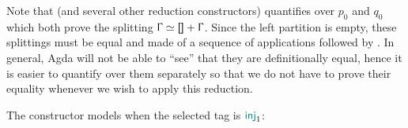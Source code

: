 Note that  (and several other reduction
constructors) quantifies over $p_0$ and $q_0$ which both prove the splitting
$\Context \simeq \AgdaInductiveConstructor{[]} + \Context$. Since the left
partition is empty, these splittings must be equal and made of a sequence of
\AgdaInductiveConstructor{>} applications followed by
. In general, Agda will not be able to ``see'' that
they are definitionally equal, hence it is easier to quantify over them separately so
that we do not have to prove their equality whenever we wish to apply this
reduction.

The constructor  models \RSelect when the
selected tag is $\mathsf{\color{teal}inj}_1$:

\begin{code}%
%
\>[2]%
\>[14]\AgdaSymbol{:}%
\>[285I]\AgdaSpace{}%
\AgdaSpace{}%
\AgdaSpace{}%
\AgdaSpace{}%
\AgdaSpace{}%
\AgdaSpace{}%
\AgdaSymbol{\}}\<%
\\
\>[.][@{}l@{}]\<[285I]%
\>[16]\AgdaSymbol{(}\AgdaSpace{}%
\AgdaSymbol{:}\AgdaSpace{}%
\AgdaSpace{}%
\AgdaSpace{}%
\AgdaSpace{}%
\AgdaOperator{\AgdaDatatype{+}}\AgdaSpace{}%
\AgdaSymbol{)}\AgdaSpace{}%
\AgdaSymbol{(}\AgdaSpace{}%
\AgdaSymbol{:}\AgdaSpace{}%
\AgdaSpace{}%
\AgdaSpace{}%
\AgdaInductiveConstructor{[]}\AgdaSpace{}%
\AgdaOperator{\AgdaDatatype{+}}\AgdaSpace{}%
\AgdaSymbol{)}\AgdaSpace{}%
\AgdaSymbol{(}\AgdaSpace{}%
\AgdaSymbol{:}\AgdaSpace{}%
\AgdaSpace{}%
\AgdaSpace{}%
\AgdaInductiveConstructor{[]}\AgdaSpace{}%
\AgdaOperator{\AgdaDatatype{+}}\AgdaSpace{}%
\AgdaSymbol{)}\AgdaSpace{}%
\<%
\\
%
\>[16]\AgdaSpace{}%
\AgdaSymbol{\{}\AgdaSpace{}%
\AgdaSpace{}%
\AgdaSymbol{\}}%
\>[316I]\AgdaSymbol{(}\AgdaSpace{}%
\AgdaSymbol{(}\AgdaSpace{}%
\AgdaSpace{}%
\AgdaOperator{\AgdaInductiveConstructor{<}}\AgdaSpace{}%
\AgdaSpace{}%
\AgdaSpace{}%
\AgdaSpace{}%

\end{code}
